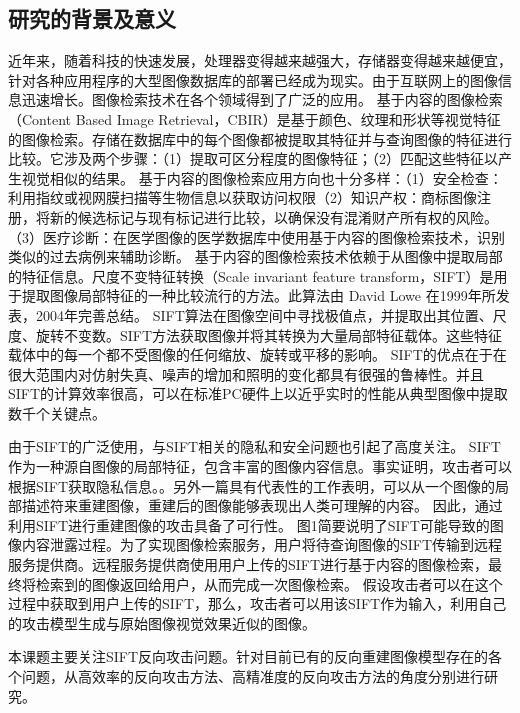 \subsection{研究的背景及意义}
近年来，随着科技的快速发展，处理器变得越来越强大，存储器变得越来越便宜，针对各种应用程序的大型图像数据库的部署已经成为现实。由于互联网上的图像信息迅速增长。图像检索技术在各个领域得到了广泛的应用。
基于内容的图像检索（Content Based Image Retrieval，CBIR）\cite{2015Content}是基于颜色、纹理和形状等视觉特征的图像检索。存储在数据库中的每个图像都被提取其特征并与查询图像的特征进行比较。它涉及两个步骤：（1）提取可区分程度的图像特征；（2）匹配这些特征以产生视觉相似的结果。
基于内容的图像检索应用方向也十分多样：（1）安全检查：利用指纹或视网膜扫描等生物信息以获取访问权限（2）知识产权：商标图像注册，将新的候选标记与现有标记进行比较，以确保没有混淆财产所有权的风险。（3）医疗诊断：在医学图像的医学数据库中使用基于内容的图像检索技术，识别类似的过去病例来辅助诊断。
基于内容的图像检索技术依赖于从图像中提取局部的特征信息。尺度不变特征转换（Scale invariant feature transform，SIFT）\cite{loweDistinctiveImageFeatures2004}是用于提取图像局部特征的一种比较流行的方法。此算法由 David Lowe 在1999年所发表，2004年完善总结。
SIFT算法在图像空间中寻找极值点，并提取出其位置、尺度、旋转不变数。SIFT方法获取图像并将其转换为大量局部特征载体。这些特征载体中的每一个都不受图像的任何缩放、旋转或平移的影响。
SIFT的优点在于在很大范围内对仿射失真、噪声的增加和照明的变化都具有很强的鲁棒性。并且SIFT的计算效率很高，可以在标准PC硬件上以近乎实时的性能从典型图像中提取数千个关键点。
\par
由于SIFT的广泛使用，与SIFT相关的隐私和安全问题也引起了高度关注。\cite{9762698}\cite{Qin2014TowardsEP}
SIFT作为一种源自图像的局部特征，包含丰富的图像内容信息。\cite{10214250}事实证明，攻击者可以根据SIFT获取隐私信息。\cite{10.1145/3386082}。另外一篇具有代表性的工作\cite{5995616}表明，可以从一个图像的局部描述符来重建图像，重建后的图像能够表现出人类可理解的内容。
因此，通过利用SIFT进行重建图像的攻击具备了可行性。
图1简要说明了SIFT可能导致的图像内容泄露过程。为了实现图像检索服务，用户将待查询图像的SIFT传输到远程服务提供商。远程服务提供商使用用户上传的SIFT进行基于内容的图像检索，最终将检索到的图像返回给用户，从而完成一次图像检索。
假设攻击者可以在这个过程中获取到用户上传的SIFT，那么，攻击者可以用该SIFT作为输入，利用自己的攻击模型生成与原始图像视觉效果近似的图像。\cite{10.1145/3599589.3599596}\cite{SUN2020102642}
\par
本课题主要关注SIFT反向攻击问题。针对目前已有的反向重建图像模型存在的各个问题，从高效率的反向攻击方法、高精准度的反向攻击方法的角度分别进行研究。
